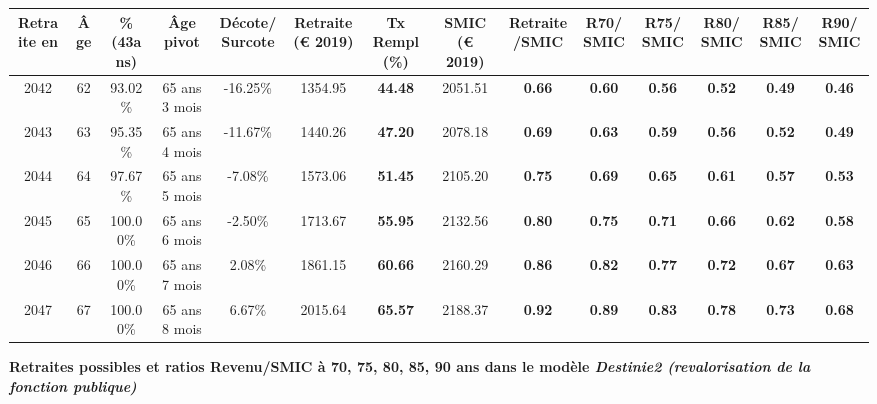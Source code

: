\begin{adjustbox}{max width=\textwidth} 
\begin{tabular}[htb]{|c|c||c|c|c||c|c||c|c||c|c|c|c|c|} 
\hline 
 Retraite en &  Âge &  \%(43ans) &  Âge pivot &  Décote/Surcote &  Retraite (\euro{} 2019) &  Tx Rempl(\%) &  SMIC (\euro{} 2019) &  Retraite/SMIC &  R70/SMIC &  R75/SMIC &  R80/SMIC &  R85/SMIC &  R90/SMIC \\ 
\hline \hline 
 2042 &  62 &  93.02\% &  65 ans 3 mois &  -16.25\% &  1354.95 &  {\bf 44.48} &  2051.51 &  {\bf {\color{red} 0.66}} &  {\bf {\color{red} 0.60}} &  {\bf {\color{red} 0.56}} &  {\bf {\color{red} 0.52}} &  {\bf {\color{red} 0.49}} &  {\bf {\color{red} 0.46}} \\ 
\hline 
 2043 &  63 &  95.35\% &  65 ans 4 mois &  -11.67\% &  1440.26 &  {\bf 47.20} &  2078.18 &  {\bf {\color{red} 0.69}} &  {\bf {\color{red} 0.63}} &  {\bf {\color{red} 0.59}} &  {\bf {\color{red} 0.56}} &  {\bf {\color{red} 0.52}} &  {\bf {\color{red} 0.49}} \\ 
\hline 
 2044 &  64 &  97.67\% &  65 ans 5 mois &  -7.08\% &  1573.06 &  {\bf 51.45} &  2105.20 &  {\bf {\color{red} 0.75}} &  {\bf {\color{red} 0.69}} &  {\bf {\color{red} 0.65}} &  {\bf {\color{red} 0.61}} &  {\bf {\color{red} 0.57}} &  {\bf {\color{red} 0.53}} \\ 
\hline 
 2045 &  65 &  100.00\% &  65 ans 6 mois &  -2.50\% &  1713.67 &  {\bf 55.95} &  2132.56 &  {\bf {\color{red} 0.80}} &  {\bf {\color{red} 0.75}} &  {\bf {\color{red} 0.71}} &  {\bf {\color{red} 0.66}} &  {\bf {\color{red} 0.62}} &  {\bf {\color{red} 0.58}} \\ 
\hline 
 2046 &  66 &  100.00\% &  65 ans 7 mois &  2.08\% &  1861.15 &  {\bf 60.66} &  2160.29 &  {\bf {\color{red} 0.86}} &  {\bf {\color{red} 0.82}} &  {\bf {\color{red} 0.77}} &  {\bf {\color{red} 0.72}} &  {\bf {\color{red} 0.67}} &  {\bf {\color{red} 0.63}} \\ 
\hline 
 2047 &  67 &  100.00\% &  65 ans 8 mois &  6.67\% &  2015.64 &  {\bf 65.57} &  2188.37 &  {\bf {\color{red} 0.92}} &  {\bf {\color{red} 0.89}} &  {\bf {\color{red} 0.83}} &  {\bf {\color{red} 0.78}} &  {\bf {\color{red} 0.73}} &  {\bf {\color{red} 0.68}} \\ 
\hline 
\hline 
\end{tabular} 
\end{adjustbox} 
 
 \vspace{0.1cm} 
{\bf \noindent Retraites possibles et ratios Revenu/SMIC à 70, 75, 80, 85, 90 ans dans le modèle \emph{Destinie2 (revalorisation de la fonction publique)}}  
 
